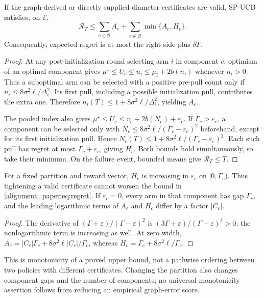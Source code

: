 \begin{theorem}
If the graph-derived or directly supplied diameter certificates are valid, SP-UCB satisfies, on $\mathcal E$,
\begin{equation}
 \mathcal R_T\le
     \sum_{c\in\mathcal O}A_c+
     \sum_{c\notin\mathcal O}\min\{A_c,H_c\}.
 \label{alignment_paper:eq:regret}
\end{equation}
Consequently, expected regret is at most the right side plus $\delta T$.
\label{alignment_paper:thm:upper}
\end{theorem}
\begin{proof}
At any post-initialization round selecting arm $i$ in component $c$, optimism of an optimal component gives
$\mu^\star\le U_c\le u_i\le\mu_i+2b(n_i)$ whenever $n_i>0$.
Thus a suboptimal arm can be selected with a positive pre-pull count only if
$n_i\le8\sigma^2\ell/\Delta_i^2$.
Its first pull, including a possible initialization pull, contributes the extra one. Therefore
$n_i(T)\le1+8\sigma^2\ell/\Delta_i^2$, yielding $A_c$.

The pooled index also gives
$\mu^\star\le U_c\le v_c+2b(N_c)+\varepsilon_c$.
If $\Gamma_c>\varepsilon_c$, a component can be selected only with
$N_c\le8\sigma^2\ell/(\Gamma_c-\varepsilon_c)^2$ beforehand, except for its first initialization pull. Hence
$N_c(T)\le1+8\sigma^2\ell/(\Gamma_c-\varepsilon_c)^2$.
Each such pull has regret at most $\Gamma_c+\varepsilon_c$, giving $H_c$.
Both bounds hold simultaneously, so take their minimum. On the failure event, bounded means give $\mathcal R_T\le T$.
\end{proof}

\begin{corollary}
For a fixed partition and reward vector, $H_c$ is increasing in $\varepsilon_c$ on $[0,\Gamma_c)$. Thus tightening a valid certificate cannot worsen the bound in \eqref{alignment_paper:eq:regret}. If $\varepsilon_c=0$, every arm in that component has gap $\Gamma_c$, and the leading logarithmic terms of $A_c$ and $H_c$ differ by a factor $|C_c|$.
\end{corollary}
\begin{proof}
The derivative of $(\Gamma+\varepsilon)/(\Gamma-\varepsilon)^2$ is
$(3\Gamma+\varepsilon)/(\Gamma-\varepsilon)^3>0$; the nonlogarithmic term is increasing as well. At zero width, $A_c=|C_c|\Gamma_c+8\sigma^2\ell|C_c|/\Gamma_c$, whereas $H_c=\Gamma_c+8\sigma^2\ell/\Gamma_c$.
\end{proof}
This is monotonicity of a proved upper bound, not a pathwise ordering between two policies with different certificates. Changing the partition also changes component gaps and the number of components; no universal monotonicity assertion follows from reducing an empirical graph-error score.

